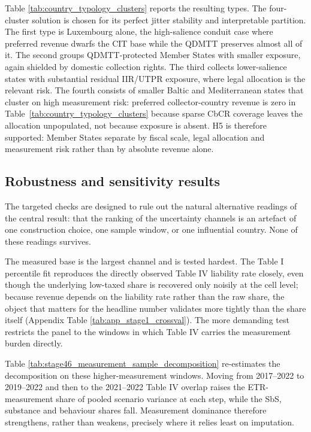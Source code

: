 \documentclass[11pt,a4paper]{article}
\begin{document}


Table \ref{tab:country_typology_clusters} reports the resulting types. The four-cluster solution is chosen for its perfect jitter stability and interpretable partition. The first type is Luxembourg alone, the high-salience conduit case where preferred revenue dwarfs the CIT base while the QDMTT preserves almost all of it. The second groups QDMTT-protected Member States with smaller exposure, again shielded by domestic collection rights. The third collects lower-salience states with substantial residual IIR/UTPR exposure, where legal allocation is the relevant risk. The fourth consists of smaller Baltic and Mediterranean states that cluster on high measurement risk: preferred collector-country revenue is zero in Table~\ref{tab:country_typology_clusters} because sparse CbCR coverage leaves the allocation unpopulated, not because exposure is absent. H5 is therefore supported: Member States separate by fiscal scale, legal allocation and measurement risk rather than by absolute revenue alone.

\subsection{Robustness and sensitivity results}\label{sec:results_robustness}

The targeted checks are designed to rule out the natural alternative readings of the central result: that the ranking of the uncertainty channels is an artefact of one construction choice, one sample window, or one influential country. None of these readings survives.

The measured base is the largest channel and is tested hardest. The Table I percentile fit reproduces the directly observed Table IV liability rate closely, even though the underlying low-taxed share is recovered only noisily at the cell level; because revenue depends on the liability rate rather than the raw share, the object that matters for the headline number validates more tightly than the share itself (Appendix Table \ref{tab:app_stage1_crossval}). The more demanding test restricts the panel to the windows in which Table IV carries the measurement burden directly.



Table \ref{tab:stage46_measurement_sample_decomposition} re-estimates the decomposition on these higher-measurement windows. Moving from 2017--2022 to 2019--2022 and then to the 2021--2022 Table IV overlap raises the ETR-measurement share of pooled scenario variance at each step, while the SbS, substance and behaviour shares fall. Measurement dominance therefore strengthens, rather than weakens, precisely where it relies least on imputation.
\end{document}
